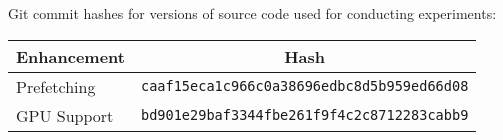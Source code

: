 Git commit hashes for versions of source code used for conducting experiments:
\begin{tabular}{l c}
  \hline
  Enhancement & Hash                                              \\
  \hline
  Prefetching & \texttt{caaf15eca1c966c0a38696edbc8d5b959ed66d08} \\
  GPU Support & \texttt{bd901e29baf3344fbe261f9f4c2c8712283cabb9} \\
  \hline
\end{tabular}
